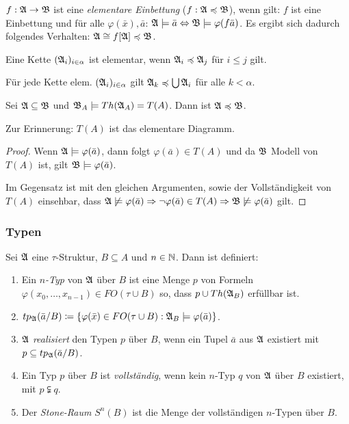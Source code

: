 \begin{definition}
	$f:\mathfrak{A}\to\mathfrak{B}$ ist eine \textit{elementare Einbettung} ($f:\mathfrak{A}\preccurlyeq\mathfrak{B}$), wenn gilt: $f$ ist eine Einbettung und für alle $\varphi(\bar{x}),\bar{a}$: $\mathfrak{A}\models\bar{a}\Leftrightarrow\mathfrak{B}\models\varphi(f\bar{a})$. Es ergibt sich dadurch folgendes Verhalten: $\mathfrak{A}\cong f[\mathfrak{A}]\preccurlyeq\mathfrak{B}$.
\end{definition}

\begin{definition}
	Eine Kette $(\mathfrak{A}_i)_{i\in \alpha}$ ist elementar, wenn $\mathfrak{A}_i\preccurlyeq\mathfrak{A}_j$ für $i\leq j$ gilt.
\end{definition}

\begin{satz}
	Für jede Kette elem. $(\mathfrak{A}_i)_{i\in \alpha}$ gilt $\mathfrak{A}_k\preccurlyeq\bigcup\mathfrak{A}_i$ für alle $k<\alpha$.
\end{satz}

\begin{lemma}
	Sei $\mathfrak{A}\subseteq\mathfrak{B}$ und $\mathfrak{B}_A\models Th(\mathfrak{A}_A)=T(A)$. Dann ist $\mathfrak{A}\preccurlyeq\mathfrak{B}$.
\end{lemma}
Zur Erinnerung: $T(A)$ ist das elementare Diagramm.
\begin{proof}
	Wenn $\mathfrak{A}\models\varphi(\bar{a})$, dann folgt $\varphi(\bar{a})\in T(A)$ und da $\mathfrak{B}$ Modell von $T(A)$ ist, gilt $\mathfrak{B}\models\varphi(\bar{a})$.
	
	Im Gegensatz ist mit den gleichen Argumenten, sowie der Vollständigkeit von $T(A)$ einsehbar, dass $\mathfrak{A}\not\models\varphi(\bar{a}) \Rightarrow \neg\varphi(\bar{a})\in T(A) \Rightarrow \mathfrak{B}\not\models\varphi(\bar{a})$ gilt.
\end{proof}


\subsubsection*{Typen}

\begin{definition}
	Sei $\mathfrak{A}$ eine $\tau$-Struktur, $B\subseteq A$ und $n\in \mathbb{N}$. Dann ist definiert:
	\begin{enumerate}
		\item Ein \textit{$n$-Typ} von $\mathfrak{A}$ über $B$ ist eine Menge $p$ von Formeln $\varphi(x_0,\dots,x_{n-1})\in FO(\tau\cup B)$ so, dass $p\cup Th(\mathfrak{A}_B)$ erfüllbar ist.
		\item $tp_{\mathfrak{A}}(\bar{a}/B)\coloneqq \{\varphi(\bar{x}) \in FO(\tau\cup B) : \mathfrak{A}_B\models\varphi(\bar{a})\}$.
		\item $\mathfrak{A}$ \textit{realisiert} den Typen $p$ über $B$, wenn ein Tupel $\bar{a}$ aus $\mathfrak{A}$ existiert mit $p\subseteq tp_{\mathfrak{A}}(\bar{a}/B)$.
		\item Ein Typ $p$ über $B$ ist \textit{vollständig}, wenn kein $n$-Typ $q$ von $\mathfrak{A}$ über $B$ existiert, mit $p\subsetneqq q$.
		\item Der \textit{Stone-Raum} $S^n(B)$ ist die Menge der vollständigen $n$-Typen über $B$.
	\end{enumerate}
\end{definition}

